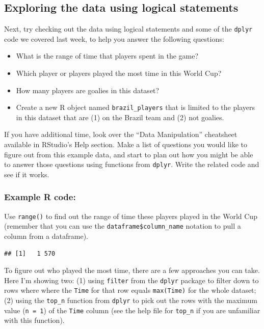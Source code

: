 \documentclass[]{book}
\makeatletter
\newenvironment{Shaded}{\begin{snugshade}}{\end{snugshade}}
\newcommand{\KeywordTok}[1]{\textcolor[rgb]{0.13,0.29,0.53}{\textbf{#1}}}
\newcommand{\OperatorTok}[1]{\textcolor[rgb]{0.81,0.36,0.00}{\textbf{#1}}}
\newcommand{\NormalTok}[1]{#1}
\providecommand{\tightlist}{%
  \setlength{\itemsep}{0pt}\setlength{\parskip}{0pt}}
\newenvironment{kframe}{%
\medskip{}
\setlength{\fboxsep}{.8em}
 \def\at@end@of@kframe{}%
 \ifinner\ifhmode%
  \def\at@end@of@kframe{\end{minipage}}%
  \begin{minipage}{\columnwidth}%
 \fi\fi%
 \def\FrameCommand##1{\hskip\@totalleftmargin \hskip-\fboxsep
 \colorbox{shadecolor}{##1}\hskip-\fboxsep
     \hskip-\linewidth \hskip-\@totalleftmargin \hskip\columnwidth}%
 \MakeFramed {\advance\hsize-\width
   \@totalleftmargin\z@ \linewidth\hsize
   \@setminipage}}%
 {\par\unskip\endMakeFramed%
 \at@end@of@kframe}
\renewenvironment{Shaded}{\begin{kframe}}{\end{kframe}}
\theoremstyle{definition}
\theoremstyle{definition}
\theoremstyle{definition}
\theoremstyle{remark}
\makeatother
\begin{document}
\subsection{Exploring the data using logical
statements}\label{exploring-the-data-using-logical-statements}

Next, try checking out the data using logical statements and some of the
\texttt{dplyr} code we covered last week, to help you answer the
following questions:

\begin{itemize}
\tightlist
\item
  What is the range of time that players spent in the game?
\item
  Which player or players played the most time in this World Cup?
\item
  How many players are goalies in this dataset?
\item
  Create a new R object named \texttt{brazil\_players} that is limited
  to the players in this dataset that are (1) on the Brazil team and (2)
  not goalies.
\end{itemize}

If you have additional time, look over the ``Data Manipulation''
cheatsheet available in RStudio's Help section. Make a list of questions
you would like to figure out from this example data, and start to plan
out how you might be able to answer those questions using functions from
\texttt{dplyr}. Write the related code and see if it works.

\subsubsection{Example R code:}\label{example-r-code-1}

Use \texttt{range()} to find out the range of time these players played
in the World Cup (remember that you can use the
\texttt{dataframe\$column\_name} notation to pull a column from a
dataframe).

\begin{Shaded}
\end{Shaded}

\begin{verbatim}
## [1]   1 570
\end{verbatim}

To figure out who played the most time, there are a few approaches you
can take. Here I'm showing two: (1) using \texttt{filter} from the
\texttt{dplyr} package to filter down to rows where where the
\texttt{Time} for that row equals \texttt{max(Time)} for the whole
dataset; (2) using the \texttt{top\_n} function from \texttt{dplyr} to
pick out the rows with the maximum value (\texttt{n\ =\ 1}) of the
\texttt{Time} column (see the help file for \texttt{top\_n} if you are
unfamiliar with this function).
\end{document}
